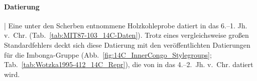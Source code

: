 \paragraph{Datierung}\hspace{-.5em}|\hspace{.5em}%
Eine unter den Scherben entnommene Holzkohleprobe datiert in das 6.--1. Jh. v.~Chr. (Tab.~\ref{tab:MIT87-103_14C-Daten}). Trotz eines vergleichsweise großen Standardfehlers deckt sich diese Datierung mit den veröffentlichten Datierungen für die Imbonga-Gruppe (Abb.~\ref{fig:14C_InnerCongo_Stylegroups}; Tab.~\ref{tab:Wotzka1995-412_14C_Repr}), die von \textcite[66\,f.]{Wotzka.1995} in das 4.--2.~Jh. v.~Chr. datiert wird.